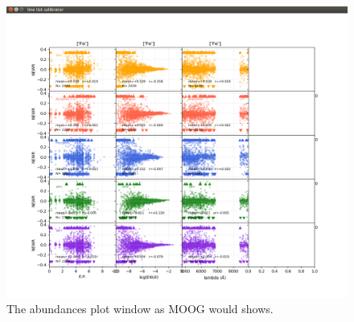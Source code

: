 \documentclass[a4paper,10pt]{article}
\begin{document}
\begin{figure}[h]
\centering
\includegraphics[width=12cm]{pics/plot_abd_mooglike.png}
\caption{The abundances plot window as MOOG would shows.}
\label{plot_abd_mooglike}
\end{figure}

\end{document}
